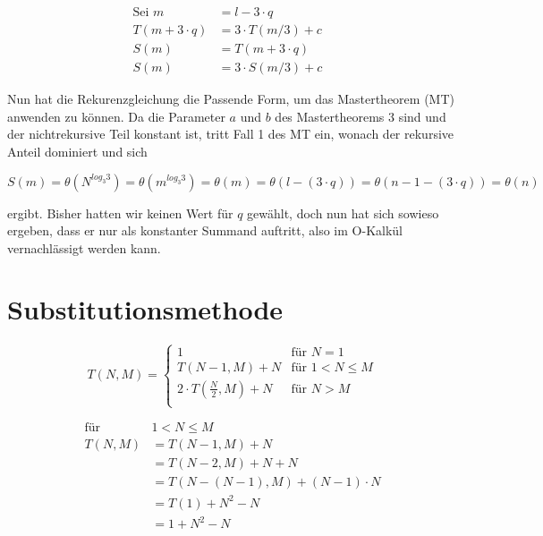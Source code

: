 \documentclass[parskip=half,a4paper]{scrartcl}
\begin{document}
\begin{equation*}
\begin{aligned}
\text{Sei $m$} & = l - 3 \cdot q &\\
T(m + 3 \cdot q) &= 3 \cdot T(m / 3) + c  \\
S(m) & = T(m + 3 \cdot q) \\
S(m) & = 3 \cdot S(m / 3) + c
\end{aligned}
\end{equation*}

Nun hat die Rekurenzgleichung die Passende Form, um das Mastertheorem (MT)
anwenden zu können. Da die Parameter $a$ und $b$ des Mastertheorems 3 sind und der
nichtrekursive Teil konstant ist, tritt Fall 1 des MT ein, wonach der rekursive
Anteil dominiert und sich

$$
S(m) = \theta(N^{log_3{3}})= \theta(m^{log_3{3}}) = \theta(m) = \theta(l - (3 \cdot q)) = \theta(n - 1 - (3 \cdot q)) = \theta(n)
$$

ergibt. Bisher hatten wir keinen Wert für $q$ gewählt, doch nun hat sich sowieso ergeben, dass er nur als konstanter Summand auftritt, also im O-Kalkül vernachlässigt werden kann.


\section*{Substitutionsmethode}

\begin{equation*}
    T(N, M) =
\begin{cases}
    1 & \text{für $N = 1$}\\
    T(N-1, M) + N & \text{für $1 < N \le M$} \\
    2 \cdot T(\frac{N}{2}, M) + N & \text{für $N > M$} \\
\end{cases}
\end{equation*}

\begin{equation*}
\begin{aligned}
    \text{für } & 1 < N \le M \\
    T(N, M) & =  T(N-1, M) + N\\
& = T(N-2, M) + N + N\\
& = T(N-(N-1), M) + (N-1) \cdot N\\
& = T(1) + N^2 - N\\
& = 1 + N^2 - N\\
\end{aligned}
\end{equation*}
\end{document}
